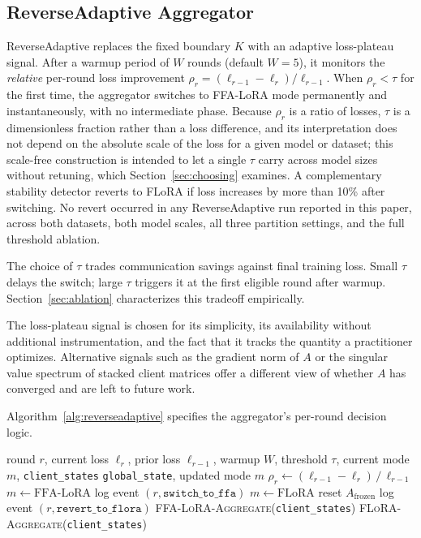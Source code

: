 \subsection{ReverseAdaptive Aggregator}
ReverseAdaptive replaces the fixed boundary $K$ with an adaptive loss-plateau signal. After a warmup period of $W$ rounds (default $W{=}5$), it monitors the \emph{relative} per-round loss improvement $\rho_r = (\ell_{r-1} - \ell_r) / \ell_{r-1}$. When $\rho_r < \tau$ for the first time, the aggregator switches to FFA-LoRA \cite{sun2024ffalora} mode permanently and instantaneously, with no intermediate phase. Because $\rho_r$ is a ratio of losses, $\tau$ is a dimensionless fraction rather than a loss difference, and its interpretation does not depend on the absolute scale of the loss for a given model or dataset; this scale-free construction is intended to let a single $\tau$ carry across model sizes without retuning, which Section~\ref{sec:choosing} examines. A complementary stability detector reverts to FLoRA if loss increases by more than 10\% after switching. No revert occurred in any ReverseAdaptive run reported in this paper, across both datasets, both model scales, all three partition settings, and the full threshold ablation.

The choice of $\tau$ trades communication savings against final training loss. Small $\tau$ delays the switch; large $\tau$ triggers it at the first eligible round after warmup. Section~\ref{sec:ablation} characterizes this tradeoff empirically.

The loss-plateau signal is chosen for its simplicity, its availability without additional instrumentation, and the fact that it tracks the quantity a practitioner optimizes. Alternative signals such as the gradient norm of $A$ or the singular value spectrum of stacked client matrices offer a different view of whether $A$ has converged and are left to future work.

Algorithm~\ref{alg:reverseadaptive} specifies the aggregator's per-round decision logic.

\begin{algorithm}[t]
\centering
\caption{ReverseAdaptive aggregator (per round)}
\label{alg:reverseadaptive}
\footnotesize
\begin{algorithmic}[1]
\Require round $r$, current loss $\ell_r$, prior loss $\ell_{r-1}$,
         warmup $W$, threshold $\tau$, current mode $m$, \texttt{client\_states}
\Ensure \texttt{global\_state}, updated mode $m$
\State $\rho_r \leftarrow (\ell_{r-1} - \ell_r) \,/\, \ell_{r-1}$ 
    \State $m \leftarrow \text{FFA-LoRA}$
    \State log event $(r, \texttt{switch\_to\_ffa})$
 
    \State $m \leftarrow \text{FLoRA}$
    \State reset $A_{\text{frozen}}$
    \State log event $(r, \texttt{revert\_to\_flora})$
\EndIf
{}
    \State \Return \textsc{FFA-LoRA-Aggregate}(\texttt{client\_states})
\Else
    \State \Return \textsc{FLoRA-Aggregate}(\texttt{client\_states})
\EndIf
\end{algorithmic}
\end{algorithm}

